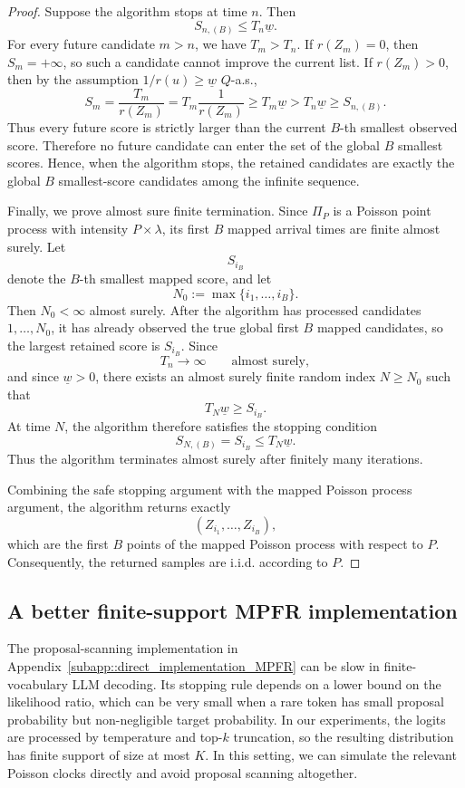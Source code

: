 \documentclass{article}
\theoremstyle{plain}
\theoremstyle{definition}
\begin{document}
\begin{proof}
Suppose the algorithm stops at time $n$. Then
\[
S_{n,(B)}\le T_n\underline w.
\]
For every future candidate $m>n$, we have $T_m>T_n$. If $r(Z_m)=0$, then
$S_m=+\infty$, so such a candidate cannot improve the current list. If
$r(Z_m)>0$, then by the assumption $1/r(u)\ge \underline w$ $Q$-a.s.,
\[
S_m
=
\frac{T_m}{r(Z_m)}
=
T_m\frac{1}{r(Z_m)}
\ge
T_m\underline w
>
T_n\underline w
\ge
S_{n,(B)}.
\]
Thus every future score is strictly larger than the current $B$-th smallest
observed score. Therefore no future candidate can enter the set of the
global $B$ smallest scores. Hence, when the algorithm stops, the retained
candidates are exactly the global $B$ smallest-score candidates among the
infinite sequence.

Finally, we prove almost sure finite termination. Since $\Pi_P$ is a
Poisson point process with intensity $P\times \lambda$, its first $B$ mapped
arrival times are finite almost surely. Let
\[
S_{i_B}
\]
denote the $B$-th smallest mapped score, and let
\[
N_0:=\max\{i_1,\ldots,i_B\}.
\]
Then $N_0<\infty$ almost surely. After the algorithm has processed
candidates $1,\ldots,N_0$, it has already observed the true global first
$B$ mapped candidates, so the largest retained score is $S_{i_B}$. Since
\[
T_n\to \infty
\qquad\text{almost surely},
\]
and since $\underline w>0$, there exists an almost surely finite random
index $N\ge N_0$ such that
\[
T_N\underline w\ge S_{i_B}.
\]
At time $N$, the algorithm therefore satisfies the stopping condition
\[
S_{N,(B)}=S_{i_B}\le T_N\underline w.
\]
Thus the algorithm terminates almost surely after finitely many iterations.

Combining the safe stopping argument with the mapped Poisson process
argument, the algorithm returns exactly
\[
(Z_{i_1},\ldots,Z_{i_B}),
\]
which are the first $B$ points of the mapped Poisson process with respect to
$P$. Consequently, the returned samples are i.i.d. according to $P$.
\end{proof}





\subsection{A better finite-support MPFR implementation}
\label{subsec::direct_topk_MPFR}

The proposal-scanning implementation in Appendix~\ref{subapp::direct_implementation_MPFR} can be slow in finite-vocabulary LLM decoding. 
Its stopping rule depends on a lower bound on the likelihood ratio, which can be very small when a rare token has small proposal probability but non-negligible target probability. 
In our experiments, the logits are processed by temperature and top-$k$ truncation, so the resulting distribution has finite support of size at most $K$. 
In this setting, we can simulate the relevant Poisson clocks directly and avoid proposal scanning altogether.
\end{document}
